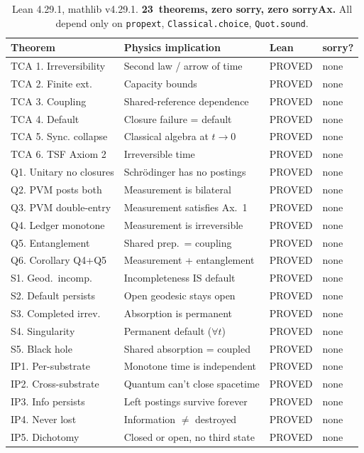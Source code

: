 \documentclass[11pt]{article}
\begin{document}
\begin{table}[h]
\centering
\begin{tabular}{@{}llll@{}}
\toprule
\textbf{Theorem} & \textbf{Physics implication} & \textbf{Lean} & \textbf{sorry?} \\
\midrule
TCA 1. Irreversibility & Second law / arrow of time & PROVED & none \\
TCA 2. Finite ext. & Capacity bounds & PROVED & none \\
TCA 3. Coupling & Shared-reference dependence & PROVED & none \\
TCA 4. Default & Closure failure = default & PROVED & none \\
TCA 5. Sync. collapse & Classical algebra at $t\to 0$ & PROVED & none \\
TCA 6. TSF Axiom 2 & Irreversible time & PROVED & none \\
\midrule
Q1. Unitary no closures & Schr\"odinger has no postings & PROVED & none \\
Q2. PVM posts both & Measurement is bilateral & PROVED & none \\
Q3. PVM double-entry & Measurement satisfies Ax.~1 & PROVED & none \\
Q4. Ledger monotone & Measurement is irreversible & PROVED & none \\
Q5. Entanglement & Shared prep.\ = coupling & PROVED & none \\
Q6. Corollary Q4+Q5 & Measurement + entanglement & PROVED & none \\
\midrule
S1. Geod.\ incomp. & Incompleteness IS default & PROVED & none \\
S2. Default persists & Open geodesic stays open & PROVED & none \\
S3. Completed irrev. & Absorption is permanent & PROVED & none \\
S4. Singularity & Permanent default ($\forall t$) & PROVED & none \\
S5. Black hole & Shared absorption = coupled & PROVED & none \\
\midrule
IP1. Per-substrate & Monotone time is independent & PROVED & none \\
IP2. Cross-substrate & Quantum can't close spacetime & PROVED & none \\
IP3. Info persists & Left postings survive forever & PROVED & none \\
IP4. Never lost & Information $\neq$ destroyed & PROVED & none \\
IP5. Dichotomy & Closed or open, no third state & PROVED & none \\
\bottomrule
\end{tabular}
\caption{Lean 4.29.1, mathlib v4.29.1.  \textbf{23~theorems, zero sorry,
zero sorryAx.}  All depend only on \texttt{propext},
\texttt{Classical.choice}, \texttt{Quot.sound}.}
\end{table}
\end{document}
